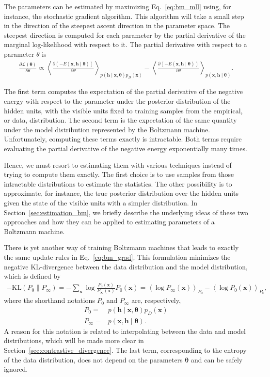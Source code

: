 \documentclass{now}
\newcommand{\vect}[1]{\mathbf{#1}}
\newcommand{\vects}[1]{\boldsymbol{#1}}
\newcommand{\vh}[0]{\vect{h}}
\newcommand{\vx}[0]{\vect{x}}
\newcommand{\TT}[0]{{\vects{\theta}}}
\newcommand{\LL}[0]{\mathcal{L}}
\newcommand{\KL}[0]{\text{KL}}
\begin{document}
The parameters can be estimated by maximizing Eq.~\eqref{eq:bm_mll} using, for
instance, the stochastic gradient algorithm. This algorithm will take a small
step in the direction of the steepest ascent direction in the parameter space.
The steepest direction is computed for each parameter by the partial derivative
of the marginal log-likelihood with respect to it. The partial derivative with
respect to a parameter $\theta$ is 
\begin{align}
    \label{eq:bm_grad}
    \frac{\partial \LL(\TT)}{\partial \theta} \propto
    \left< \frac{\partial
    \left(-E(\vx, \vh\mid\TT)\right)}{\partial \theta}
    \right>_{p\left(\vh \mid \vx,
    \TT\right)p_D\left(\vx\right) } 
    -
    \left< \frac{\partial
    \left(-E(\vx, \vh\mid\TT)\right)}{\partial \theta}
    \right>_{p\left(\vx, \vh \mid \TT\right)}.
\end{align}

The first term computes the expectation of the partial derivative of the
negative energy with respect to the parameter under the posterior distribution
of the hidden units, with the visible units fixed to training samples from the
empirical, or data, distribution. The second term is the expectation of the
same quantity under the model distribution represented by the Boltzmann
machine. Unfortunately, computing these terms exactly is intractable. Both
terms require evaluating the partial derivative of the negative energy
exponentially many times. 

Hence, we must resort to estimating them with various techniques instead of
trying to compute them exactly. The first choice is to use samples from those
intractable distributions to estimate the statistics. The other possibility is
to approximate, for instance, the true posterior distribution over the hidden
units given the state of the visible units with a simpler distribution. In
Section~\ref{sec:estimation_bm}, we briefly describe the underlying ideas of
these two approaches and how they can be applied to estimating parameters of a
Boltzmann machine. 

There is yet another way of training Boltzmann machines that leads to exactly
the same update rules in Eq.~\eqref{eq:bm_grad}. This formulation minimizes the
negative KL-divergence between the data distribution and the model
distribution, which is defined by
\begin{align}
    \label{eq:bm_kldiv}
    -\KL(P_0 \| P_\infty) = -\sum_{\vx} \log
    \frac{P_0(\vx)}{P_\infty(\vx)} P_0(\vx) =
    \left<\log P_\infty(\vx) \right>_{P_0} - \left< \log P_0
    (\vx) \right>_{P_0},
\end{align}
where the shorthand notations $P_0$ and $P_\infty$ are, respectively, 
\begin{align*}
    P_0 =& p\left(\vh \mid \vx, \TT\right)p_D\left(\vx\right)
    \\
    P_\infty =& p\left(\vx, \vh \mid \TT\right).
\end{align*}
A reason for this notation is related to interpolating between the data and
model distributions, which will be made more clear in
Section~\ref{sec:contrastive_divergence}. The last term, corresponding to the
entropy of the data distribution, does not depend on the parameters $\TT$ and
can be safely ignored.
\end{document}
